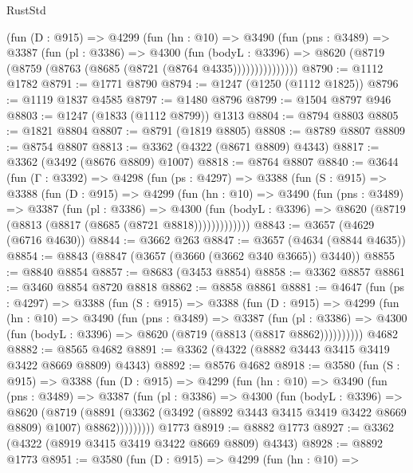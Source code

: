 \begin{lexlean}{RustStd}
\begin{coremodule}
            (fun (D : @915) =>
            @4299
              (fun (hn : @10) =>
              @3490
                (fun (pns : @3489) =>
                @3387
                  (fun (pl : @3386) =>
                  @4300
                    (fun (bodyL : @3396) =>
                    @8620 (@8719 (@8759 (@8763 (@8685 (@8721 (@8764 @4335)))))))))))))))
@8790 := @1112 @1782
@8791 := @1771 @8790
@8794 := @1247 (@1250 (@1112 @1825))
@8796 := @1119 @1837 @4585
@8797 := @1480 @8796
@8799 := @1504 @8797 @946
@8803 := @1247 (@1833 (@1112 @8799)) @1313
@8804 := @8794 @8803
@8805 := @1821 @8804
@8807 := @8791 (@1819 @8805)
@8808 := @8789 @8807
@8809 := @8754 @8807
@8813 := @3362 (@4322 (@8671 @8809) @4343)
@8817 := @3362 (@3492 (@8676 @8809) @1007)
@8818 := @8764 @8807
@8840 := @3644
    (fun (Γ : @3392) =>
    @4298
      (fun (ps : @4297) =>
      @3388
        (fun (S : @915) =>
        @3388
          (fun (D : @915) =>
          @4299
            (fun (hn : @10) =>
            @3490
              (fun (pns : @3489) =>
              @3387
                (fun (pl : @3386) =>
                @4300
                  (fun (bodyL : @3396) =>
                  @8620 (@8719 (@8813 (@8817 (@8685 (@8721 @8818)))))))))))))
@8843 := @3657 (@4629 (@6716 @4630))
@8844 := @3662 @263
@8847 := @3657 (@4634 (@8844 @4635))
@8854 := @8843 (@8847 (@3657 (@3660 (@3662 @340 @3665)) @3440))
@8855 := @8840 @8854
@8857 := @8683 (@3453 @8854)
@8858 := @3362 @8857
@8861 := @3460 @8854 @8720 @8818
@8862 := @8858 @8861
@8881 := @4647
    (fun (ps : @4297) =>
    @3388
      (fun (S : @915) =>
      @3388
        (fun (D : @915) =>
        @4299
          (fun (hn : @10) =>
          @3490
            (fun (pns : @3489) =>
            @3387
              (fun (pl : @3386) =>
              @4300 (fun (bodyL : @3396) => @8620 (@8719 (@8813 (@8817 @8862))))))))))
    @4682
@8882 := @8565 @4682
@8891 := @3362 (@4322 (@8882 @3443 @3415 @3419 @3422 @8669 @8809) @4343)
@8892 := @8576 @4682
@8918 := @3580
    (fun (S : @915) =>
    @3388
      (fun (D : @915) =>
      @4299
        (fun (hn : @10) =>
        @3490
          (fun (pns : @3489) =>
          @3387
            (fun (pl : @3386) =>
            @4300
              (fun (bodyL : @3396) =>
              @8620
                (@8719
                  (@8891
                    (@3362 (@3492 (@8892 @3443 @3415 @3419 @3422 @8669 @8809) @1007) @8862)))))))))
    @1773
@8919 := @8882 @1773
@8927 := @3362 (@4322 (@8919 @3415 @3419 @3422 @8669 @8809) @4343)
@8928 := @8892 @1773
@8951 := @3580
    (fun (D : @915) =>
    @4299
      (fun (hn : @10) =>

\end{coremodule}
\end{lexlean}
